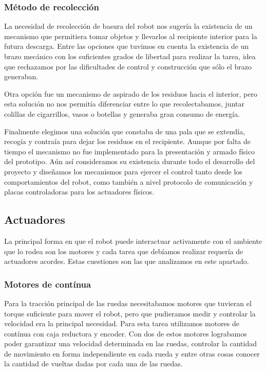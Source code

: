 \subsubsection{M\'etodo de recolecci\'on}
\label{h_ideas_recoleccion}

La necesidad de recolecci\'on de basura del robot nos suger\'ia la existencia de un mecanismo que permitiera
tomar objetos y llevarlos al recipiente interior para la futura descarga.
Entre las opciones que tuvimos en cuenta la existencia de un brazo mec\'anico con los suficientes grados de
libertad para realizar la tarea, idea que rechazamos por las dificultades de control y construcci\'on que
s\'olo el brazo generaban.

Otra opci\'on fue un mecanismo de aspirado de los residuos hacia el interior, pero esta soluci\'on no nos
permit\'ia diferenciar entre lo que recolectabamos, juntar colillas de cigarrillos, vasos o botellas y
generaba gran consumo de energ\'ia.

Finalmente elegimos una soluci\'on que constaba de una pala que se extend\'ia, recog\'ia y contra\'ia para
dejar los residuos en el recipiente.
Aunque por falta de tiempo el mecanismo no fue implementado para la presentaci\'on y armado f\'isico del prototipo.
A\'un as\'i consideramos su existencia durante todo el desarrollo del proyecto y dise\~namos los mecanismos
para ejercer el control tanto desde los comportamientos del robot, como tambi\'en a nivel protocolo de
comunicaci\'on y placas controladoras para los actuadores f\'isicos.

\subsection{Actuadores}
\label{h_actuadores}

La principal forma en que el robot puede interactuar activamente con el ambiente que lo rodea son los motores y
cada tarea que deb\'iamos realizar requer\'ia de actuadores acordes.
Estas cuestiones son las que analizamos en este apartado.

\subsubsection{Motores de cont\'inua}
\label{h_actuadores_motorDC}

Para la tracci\'on principal de las ruedas necesitabamos motores que tuvieran el torque suficiente
para mover el robot, pero que pudieramos medir y controlar la velocidad era la principal necesidad.
Para esta tarea utilizamos motores de cont\'inua con caja reductora y encoder.
Con dos de estos motores lograbamos poder garantizar una velocidad determinada en las ruedas, controlar
la cantidad de movimiento en forma independiente en cada rueda y entre otras cosas conocer la cantidad
de vueltas dadas por cada una de las ruedas.


